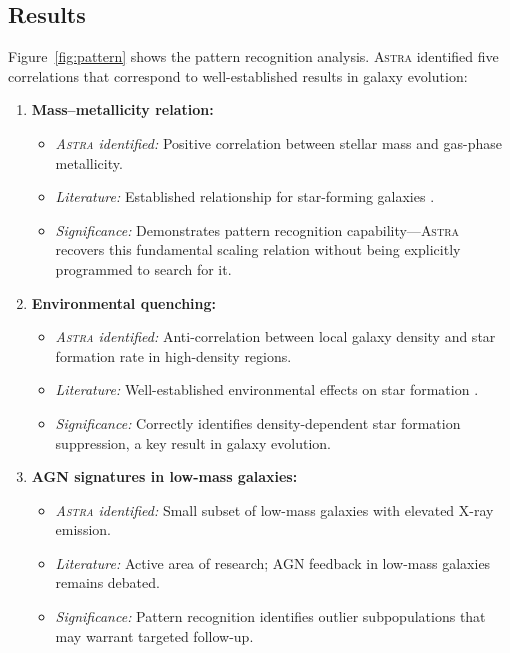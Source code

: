 \documentclass[fleqn,usenatbib]{mnras}
\newcommand{\astra}{\textsc{Astra}\xspace}
\begin{document}
\subsection{Results}
\label{sec:tc3:results}

Figure~\ref{fig:pattern} shows the pattern recognition analysis.
\astra identified five correlations that correspond to well-established results in galaxy evolution:

\begin{enumerate}
  \item[(i)] \textbf{Mass--metallicity relation:}
  \begin{itemize}
    \item \emph{\astra identified:} Positive correlation between stellar mass and gas-phase metallicity.
    \item \emph{Literature:} Established relationship for star-forming galaxies \citep{Tremonti2004}.
    \item \emph{Significance:} Demonstrates pattern recognition capability---\astra recovers this fundamental scaling relation without being explicitly programmed to search for it.
  \end{itemize}

  \item[(ii)] \textbf{Environmental quenching:}
  \begin{itemize}
    \item \emph{\astra identified:} Anti-correlation between local galaxy density and star formation rate in high-density regions.
    \item \emph{Literature:} Well-established environmental effects on star formation \citep{Dressler1980,Peng2010}.
    \item \emph{Significance:} Correctly identifies density-dependent star formation suppression, a key result in galaxy evolution.
  \end{itemize}

  \item[(iii)] \textbf{AGN signatures in low-mass galaxies:}
  \begin{itemize}
    \item \emph{\astra identified:} Small subset of low-mass galaxies with elevated X-ray emission.
    \item \emph{Literature:} Active area of research; AGN feedback in low-mass galaxies remains debated.
    \item \emph{Significance:} Pattern recognition identifies outlier subpopulations that may warrant targeted follow-up.
  \end{itemize}


\end{enumerate}
\end{document}
